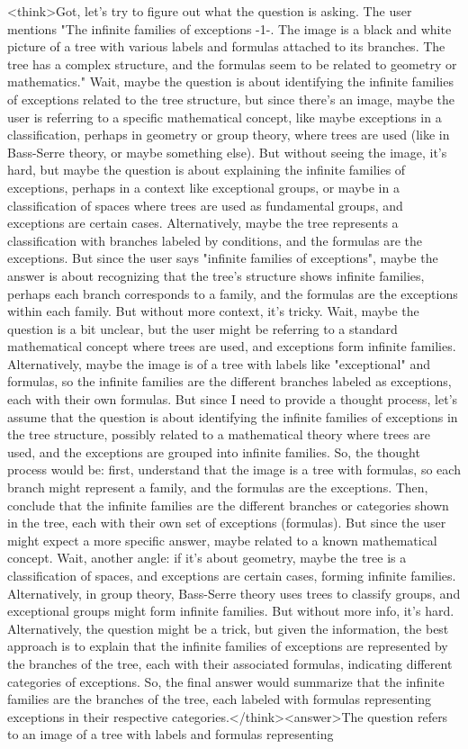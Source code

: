 <think>Got, let's try to figure out what the question is asking. The user mentions "The infinite families of exceptions -1-. The image is a black and white picture of a tree with various labels and formulas attached to its branches. The tree has a complex structure, and the formulas seem to be related to geometry or mathematics." Wait, maybe the question is about identifying the infinite families of exceptions related to the tree structure, but since there's an image, maybe the user is referring to a specific mathematical concept, like maybe exceptions in a classification, perhaps in geometry or group theory, where trees are used (like in Bass-Serre theory, or maybe something else). But without seeing the image, it's hard, but maybe the question is about explaining the infinite families of exceptions, perhaps in a context like exceptional groups, or maybe in a classification of spaces where trees are used as fundamental groups, and exceptions are certain cases. Alternatively, maybe the tree represents a classification with branches labeled by conditions, and the formulas are the exceptions. But since the user says "infinite families of exceptions", maybe the answer is about recognizing that the tree's structure shows infinite families, perhaps each branch corresponds to a family, and the formulas are the exceptions within each family. But without more context, it's tricky. Wait, maybe the question is a bit unclear, but the user might be referring to a standard mathematical concept where trees are used, and exceptions form infinite families. Alternatively, maybe the image is of a tree with labels like "exceptional" and formulas, so the infinite families are the different branches labeled as exceptions, each with their own formulas. But since I need to provide a thought process, let's assume that the question is about identifying the infinite families of exceptions in the tree structure, possibly related to a mathematical theory where trees are used, and the exceptions are grouped into infinite families. So, the thought process would be: first, understand that the image is a tree with formulas, so each branch might represent a family, and the formulas are the exceptions. Then, conclude that the infinite families are the different branches or categories shown in the tree, each with their own set of exceptions (formulas). But since the user might expect a more specific answer, maybe related to a known mathematical concept. Wait, another angle: if it's about geometry, maybe the tree is a classification of spaces, and exceptions are certain cases, forming infinite families. Alternatively, in group theory, Bass-Serre theory uses trees to classify groups, and exceptional groups might form infinite families. But without more info, it's hard. Alternatively, the question might be a trick, but given the information, the best approach is to explain that the infinite families of exceptions are represented by the branches of the tree, each with their associated formulas, indicating different categories of exceptions. So, the final answer would summarize that the infinite families are the branches of the tree, each labeled with formulas representing exceptions in their respective categories.</think><answer>The question refers to an image of a tree with labels and formulas representing 